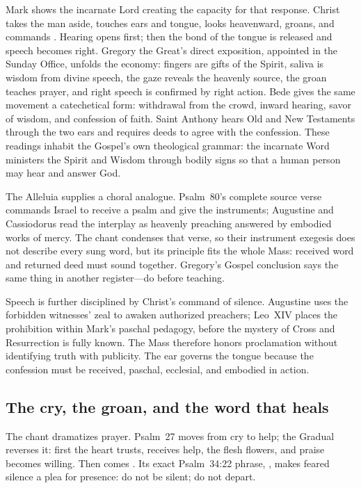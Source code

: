 Mark shows the incarnate Lord creating the capacity for that response. Christ
takes the man aside, touches ears and tongue, looks heavenward, groans, and
commands . Hearing opens first; then the bond of the tongue is
released and speech becomes right. Gregory the Great's direct exposition,
appointed in the Sunday Office, unfolds the economy: fingers are gifts of the
Spirit, saliva is wisdom from divine speech, the gaze reveals the heavenly
source, the groan teaches prayer, and right speech is confirmed by right
action. Bede gives the same movement a catechetical form: withdrawal from the
crowd, inward hearing, savor of wisdom, and confession of faith. Saint Anthony
hears Old and New Testaments through the two ears and requires deeds to agree
with the confession. These readings inhabit the Gospel's own theological
grammar: the incarnate Word ministers the Spirit and Wisdom through bodily
signs so that a human person may hear and answer God.

The Alleluia supplies a choral analogue. Psalm~80's complete source verse
commands Israel to receive a psalm and give the instruments; Augustine and
Cassiodorus read the interplay as heavenly preaching answered by embodied
works of mercy. The chant condenses that verse, so their instrument exegesis
does not describe every sung word, but its principle fits the whole Mass:
received word and returned deed must sound together. Gregory's Gospel
conclusion says the same thing in another register---do before teaching.

Speech is further disciplined by Christ's command of silence. Augustine uses
the forbidden witnesses' zeal to awaken authorized preachers; Leo~XIV places
the prohibition within Mark's paschal pedagogy, before the mystery of Cross and
Resurrection is fully known. The Mass therefore honors proclamation without
identifying truth with publicity. The ear governs the tongue because the
confession must be received, paschal, ecclesial, and embodied in action.

\subsection*{The cry, the groan, and the word that heals}

The chant dramatizes prayer. Psalm~27 moves from cry to help; the Gradual
reverses it: first the heart trusts, receives help, the flesh flowers, and
praise becomes willing. Then comes . Its exact
Psalm~34:22 phrase, , makes feared silence a plea for
presence: do not be silent; do not depart.


